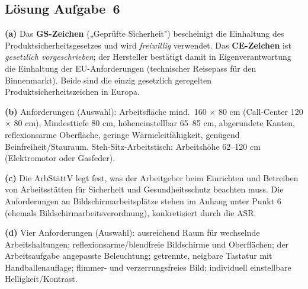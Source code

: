 \documentclass[11pt, a4paper]{article}
\begin{document}
\subsection*{Lösung Aufgabe~6}
\begin{loesung}
\textbf{(a)} Das \textbf{GS-Zeichen} („Geprüfte Sicherheit") bescheinigt die Einhaltung des
Produktsicherheitsgesetzes und wird \emph{freiwillig} verwendet. Das \textbf{CE-Zeichen} ist
\emph{gesetzlich vorgeschrieben}; der Hersteller bestätigt damit in Eigenverantwortung die
Einhaltung der EU-Anforderungen (technischer Reisepass für den Binnenmarkt). Beide sind die
einzig gesetzlich geregelten Produktsicherheitszeichen in Europa.

\textbf{(b)} Anforderungen (Auswahl): Arbeitsfläche mind.\ 160 $\times$ 80 cm (Call-Center
120 $\times$ 80 cm), Mindesttiefe 80 cm, höheneinstellbar 65--85 cm, abgerundete Kanten,
reflexionsarme Oberfläche, geringe Wärmeleitfähigkeit, genügend Beinfreiheit/Stauraum.
Steh-Sitz-Arbeitstisch: Arbeitshöhe 62--120 cm (Elektromotor oder Gasfeder).

\textbf{(c)} Die ArbStättV legt fest, was der Arbeitgeber beim Einrichten und Betreiben von
Arbeitsstätten für Sicherheit und Gesundheitsschutz beachten muss. Die Anforderungen an
Bildschirmarbeitsplätze stehen im Anhang unter Punkt 6 (ehemals Bildschirmarbeitsverordnung),
konkretisiert durch die ASR.

\textbf{(d)} Vier Anforderungen (Auswahl): ausreichend Raum für wechselnde Arbeitshaltungen;
reflexionsarme/blendfreie Bildschirme und Oberflächen; der Arbeitsaufgabe angepasste
Beleuchtung; getrennte, neigbare Tastatur mit Handballenauflage; flimmer- und verzerrungs\-freies
Bild; individuell einstellbare Helligkeit/Kontrast.
\end{loesung}
\end{document}
